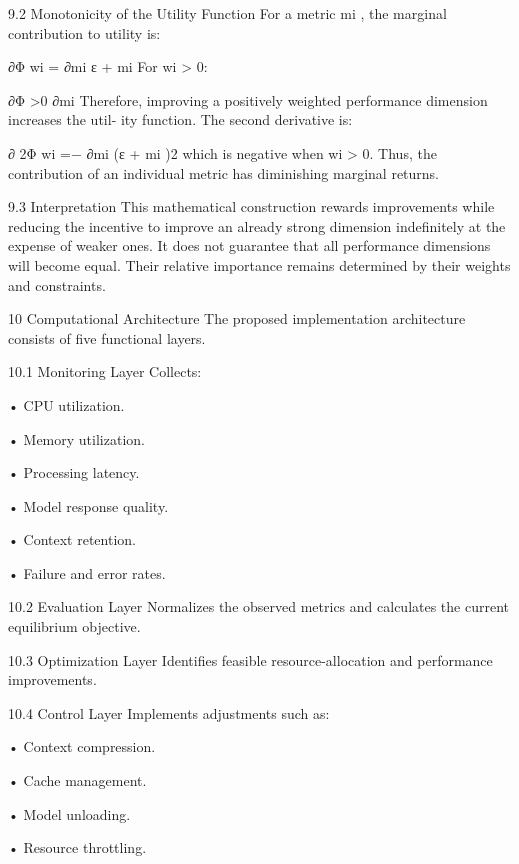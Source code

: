 \documentclass[10pt,a4paper]{article}
\begin{document}
\begin{ManuscriptText}
9.2    Monotonicity of the Utility Function
For a metric mi , the marginal contribution to utility is:

                                      ∂Φ      wi
                                          =
                                      ∂mi   ε + mi
    For wi > 0:

                                         ∂Φ
                                             >0
                                         ∂mi
    Therefore, improving a positively weighted performance dimension increases the util-
ity function.
    The second derivative is:

                                    ∂ 2Φ         wi
                                          =−
                                    ∂mi      (ε + mi )2
    which is negative when wi > 0.
    Thus, the contribution of an individual metric has diminishing marginal returns.


9.3    Interpretation
This mathematical construction rewards improvements while reducing the incentive to
improve an already strong dimension indefinitely at the expense of weaker ones.
    It does not guarantee that all performance dimensions will become equal. Their
relative importance remains determined by their weights and constraints.


10     Computational Architecture
The proposed implementation architecture consists of five functional layers.


10.1        Monitoring Layer
Collects:

  • CPU utilization.

  • Memory utilization.

  • Processing latency.

  • Model response quality.

  • Context retention.

  • Failure and error rates.


10.2        Evaluation Layer
Normalizes the observed metrics and calculates the current equilibrium objective.


10.3        Optimization Layer
Identifies feasible resource-allocation and performance improvements.


10.4        Control Layer
Implements adjustments such as:

  • Context compression.

  • Cache management.

  • Model unloading.


  • Resource throttling.


\end{ManuscriptText}
\end{document}
